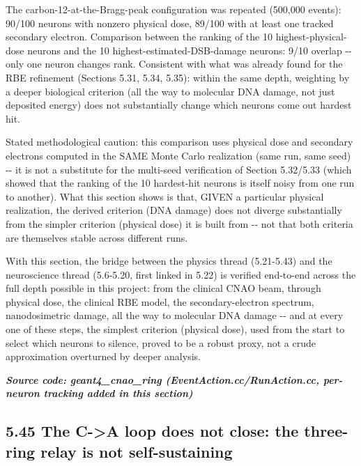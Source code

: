 \documentclass[
  english,
]{article}
\begin{document}
The carbon-12-at-the-Bragg-peak configuration was repeated (500,000 events): 90/100 neurons with nonzero physical dose, 89/100 with at least one tracked secondary electron. Comparison between the ranking of the 10 highest-physical-dose neurons and the 10 highest-estimated-DSB-damage neurons: 9/10 overlap -\/- only one neuron changes rank. Consistent with what was already found for the RBE refinement (Sections 5.31, 5.34, 5.35): within the same depth, weighting by a deeper biological criterion (all the way to molecular DNA damage, not just deposited energy) does not substantially change which neurons come out hardest hit.

Stated methodological caution: this comparison uses physical dose and secondary electrons computed in the SAME Monte Carlo realization (same run, same seed) -\/- it is not a substitute for the multi-seed verification of Section 5.32/5.33 (which showed that the ranking of the 10 hardest-hit neurons is itself noisy from one run to another). What this section shows is that, GIVEN a particular physical realization, the derived criterion (DNA damage) does not diverge substantially from the simpler criterion (physical dose) it is built from -\/- not that both criteria are themselves stable across different runs.

With this section, the bridge between the physics thread (5.21-5.43) and the neuroscience thread (5.6-5.20, first linked in 5.22) is verified end-to-end across the full depth possible in this project: from the clinical CNAO beam, through physical dose, the clinical RBE model, the secondary-electron spectrum, nanodosimetric damage, all the way to molecular DNA damage -\/- and at every one of these steps, the simplest criterion (physical dose), used from the start to select which neurons to silence, proved to be a robust proxy, not a crude approximation overturned by deeper analysis.

\textit{\textbf{Source code: geant4\_\allowbreak{}cnao\_\allowbreak{}ring (EventAction.cc/RunAction.cc, per-neuron tracking added in this section)}}



\subsection{5.45 The C-\textgreater A loop does not close: the three-ring relay is not self-sustaining}\label{the-c-a-loop-does-not-close-the-three-ring-relay-is-not-self-sustaining}
\end{document}

